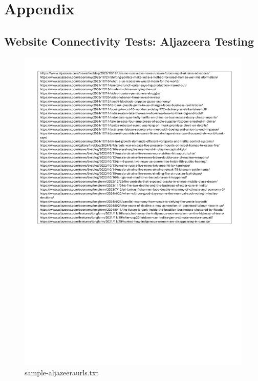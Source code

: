 \chapter{Appendix}

\section{Website Connectivity Tests: Aljazeera Testing}

\begin{figure} [H]
    \centering
    \includegraphics[width=1\linewidth]{sample-aljazeera.pdf}
    \caption{sample-aljazeeraurls.txt}
    \label{fig:enter-label}
\end{figure}

